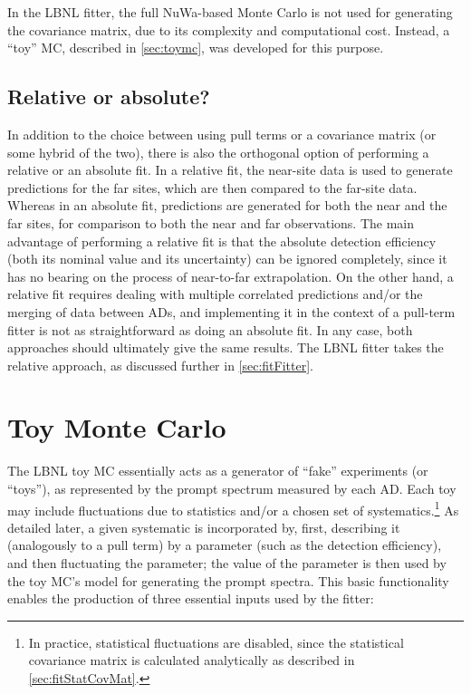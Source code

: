 \documentclass[../thesis.tex]{subfiles}
\begin{document}
In the LBNL fitter, the full NuWa-based Monte Carlo is not used for generating the covariance matrix, due to its complexity and computational cost. Instead, a ``toy'' MC, described in \autoref{sec:toymc}, was developed for this purpose.

\subsection{Relative or absolute?}
\label{sec:fitRelOrAbs}

In addition to the choice between using pull terms or a covariance matrix (or some hybrid of the two), there is also the orthogonal option of performing a relative or an absolute fit. In a relative fit, the near-site data is used to generate predictions for the far sites, which are then compared to the far-site data. Whereas in an absolute fit, predictions are generated for both the near and the far sites, for comparison to both the near and far observations. The main advantage of performing a relative fit is that the absolute detection efficiency (both its nominal value and its uncertainty) can be ignored completely, since it has no bearing on the process of near-to-far extrapolation. On the other hand, a relative fit requires dealing with multiple correlated predictions and/or the merging of data between ADs, and implementing it in the context of a pull-term fitter is not as straightforward as doing an absolute fit. In any case, both approaches should ultimately give the same results. The LBNL fitter takes the relative approach, as discussed further in \autoref{sec:fitFitter}.

\section{Toy Monte Carlo}
\label{sec:toymc}

The LBNL toy MC \cite{berkeley_toymc} essentially acts as a generator of ``fake'' experiments (or ``toys''), as represented by the prompt spectrum measured by each AD. Each toy may include fluctuations due to statistics and/or a chosen set of systematics.\footnote{In practice, statistical fluctuations are disabled, since the statistical covariance matrix is calculated analytically as described in \autoref{sec:fitStatCovMat}.} As detailed later, a given systematic is incorporated by, first, describing it (analogously to a pull term) by a parameter (such as the detection efficiency), and then fluctuating the parameter; the value of the parameter is then used by the toy MC's model for generating the prompt spectra. This basic functionality enables the production of three essential inputs used by the fitter:
\end{document}
